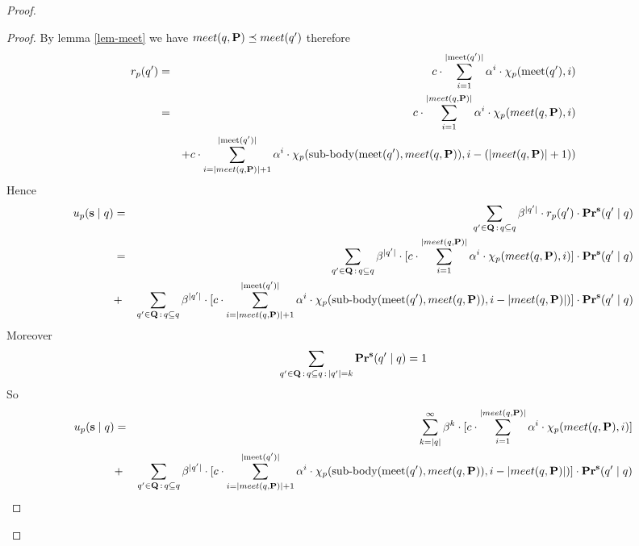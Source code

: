 \begin{proof}
\begin{proof}
	By lemma \ref{lem-meet} we have $meet(q,\mathbf{P}) \preceq meet(q')$ therefore
	\begin{eqnarray*}
		r_p(q') & = &{\displaystyle c \cdot \sum_{i=1}^{|\text{\rm meet}(q')|} \alpha^i \cdot \chi_p(\text{\rm meet}(q'),i)} \\
		& = & {\displaystyle c \cdot \sum_{i=1}^{|meet(q,\mathbf{P})|} \alpha^i \cdot \chi_p(meet(q,\mathbf{P}),i) } \\
		&&	+ {\displaystyle c \cdot \sum_{i=|meet(q,\mathbf{P})|+1}^{|\text{\rm meet}(q')|} \alpha^{i} \cdot \chi_p({\text{\rm sub-body}}(\text{\rm meet}(q'),meet(q,\mathbf{P})),i-(|meet(q,\mathbf{P})|+1))  }   \\
	\end{eqnarray*}
Hence 
	\begin{eqnarray*}
		u_p(\mathbf{s} \mid q)& = & \sum_{q' \in \mathbf{Q} \,:\, q \subseteq q} \beta^{|q'|} \cdot  r_p(q') \cdot \mathbf{Pr}^{\mathbf{s}}(q' \mid q) \\ 
		& = & \sum_{q' \in \mathbf{Q} \,:\, q \subseteq q} \beta^{|q'|} \cdot  [{\displaystyle c \cdot \sum_{i=1}^{|meet(q,\mathbf{P})|} \alpha^i \cdot \chi_p(meet(q,\mathbf{P}),i) }] \cdot \mathbf{Pr}^{\mathbf{s}}(q' \mid q) \\
		&+ & \sum_{q' \in \mathbf{Q} \,:\, q \subseteq q} \beta^{|q'|} \cdot  [{\displaystyle c \cdot \sum_{i=|meet(q,\mathbf{P})|+1}^{|\text{\rm meet}(q')|} \alpha^{i} \cdot \chi_p({\text{\rm sub-body}}(\text{\rm meet}(q'),meet(q,\mathbf{P})),i-|meet(q,\mathbf{P})|)  }] \cdot \mathbf{Pr}^{\mathbf{s}}(q' \mid q) \\
	\end{eqnarray*}
Moreover $$ \sum_{q' \in \mathbf{Q} \,:\, q \subseteq q \,:\, |q'| =k}  \mathbf{Pr}^{\mathbf{s}}(q' \mid q) = 1$$
So 
	\begin{eqnarray*}
		u_p(\mathbf{s} \mid q) & = & \sum_{k = |q|}^{\infty} \beta^{k} \cdot  [{\displaystyle c \cdot \sum_{i=1}^{|meet(q,\mathbf{P})|} \alpha^i \cdot \chi_p(meet(q,\mathbf{P}),i) }] \\
		&+ & \sum_{q' \in \mathbf{Q} \,:\, q \subseteq q} \beta^{|q'|} \cdot  [{\displaystyle c \cdot \sum_{i=|meet(q,\mathbf{P})|+1}^{|\text{\rm meet}(q')|} \alpha^{i} \cdot \chi_p({\text{\rm sub-body}}(\text{\rm meet}(q'),meet(q,\mathbf{P})),i-|meet(q,\mathbf{P})|)  }] \cdot \mathbf{Pr}^{\mathbf{s}}(q' \mid q) \\
	\end{eqnarray*}


\end{proof}
\end{proof}
